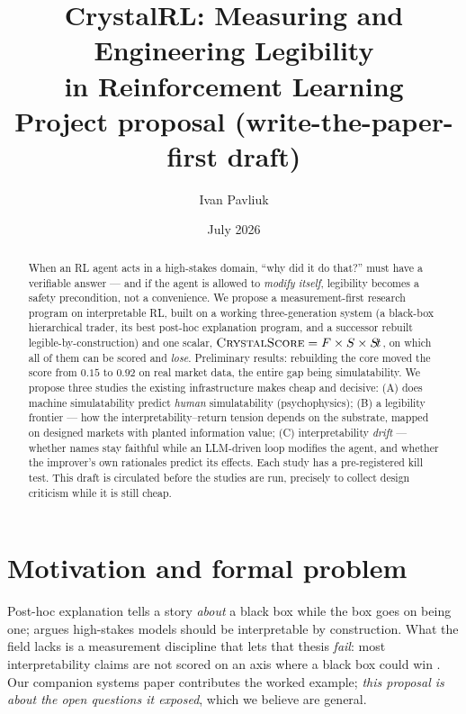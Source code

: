 \documentclass[11pt]{article}
\title{\vspace{-1.2em}CrystalRL: Measuring and Engineering Legibility\\ in Reinforcement Learning\\
\large Project proposal (write-the-paper-first draft)}
\author{Ivan Pavliuk}
\date{July 2026}
\begin{document}
\maketitle
\vspace{-2.2em}

\begin{abstract}
\noindent When an RL agent acts in a high-stakes domain, ``why did it do that?'' must have a
verifiable answer --- and if the agent is allowed to \emph{modify itself}, legibility becomes a
safety precondition, not a convenience. We propose a measurement-first research program on
interpretable RL, built on a working three-generation system (a black-box hierarchical trader,
its best post-hoc explanation program, and a successor rebuilt legible-by-construction) and one
scalar, $\textsc{CrystalScore} = F \times S \times S\!t$, on which all of them can be scored and
\emph{lose}. Preliminary results: rebuilding the core moved the score from $0.15$ to $0.92$ on
real market data, the entire gap being simulatability. We propose three studies the existing
infrastructure makes cheap and decisive: (A) does machine simulatability predict \emph{human}
simulatability (psychophysics); (B) a legibility frontier --- how the interpretability--return
tension depends on the substrate, mapped on designed markets with planted information value;
(C) interpretability \emph{drift} --- whether names stay faithful while an LLM-driven loop
modifies the agent, and whether the improver's own rationales predict its effects. Each study
has a pre-registered kill test. This draft is circulated before the studies are run, precisely
to collect design criticism while it is still cheap.
\end{abstract}

\section{Motivation and formal problem}
\label{sec:problem}

Post-hoc explanation tells a story \emph{about} a black box while the box goes on being one;
\citet{rudin2019} argues high-stakes models should be interpretable by construction. What the
field lacks is a measurement discipline that lets that thesis \emph{fail}: most
interpretability claims are not scored on an axis where a black box could win
\citep{doshivelez2017,lipton2018}. Our companion systems paper contributes the worked example;
\emph{this proposal is about the open questions it exposed}, which we believe are general.
\end{document}
